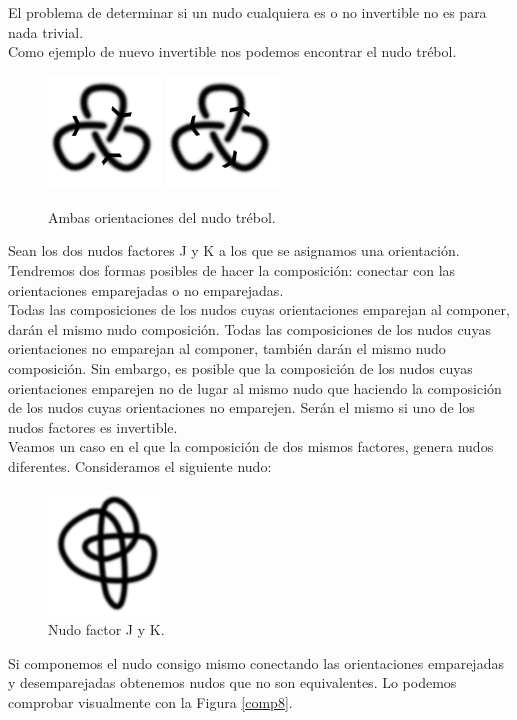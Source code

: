 \documentclass[14pt]{extarticle}
\begin{document}
      El problema de determinar si un nudo cualquiera es o no invertible no es para nada trivial.\\
   
   Como ejemplo de nuevo invertible nos podemos encontrar el nudo trébol.
      \begin{figure}[h!]
      	\includegraphics[width=3cm]{3fcon1.png}
      	\includegraphics[width=3cm]{3fcon2.png}
      	\centering
      	\caption{Ambas orientaciones del nudo trébol.}
      	\label{comp5} 
      \end{figure}
   
   Sean los dos nudos factores J y K a los que se asignamos una orientación. Tendremos dos formas posibles de hacer la composición: conectar con las orientaciones emparejadas o no emparejadas. \\
   Todas las composiciones de los nudos cuyas orientaciones emparejan al componer, darán el mismo nudo composición. Todas las composiciones de los nudos cuyas orientaciones no emparejan al componer, también darán el mismo nudo composición. Sin embargo, es posible que la composición de los nudos cuyas orientaciones emparejen no de lugar al mismo nudo que haciendo la composición de los nudos cuyas orientaciones no emparejen. Serán el mismo si uno de los nudos factores es invertible.\\
   
   Veamos un caso en el que la composición de dos mismos factores, genera nudos diferentes. Consideramos el siguiente nudo:
         \begin{figure}[h!]
         	\includegraphics[width=3cm]{817.png}
         	\centering
         	\caption{Nudo factor J y K.}
         	\label{comp7} 
         \end{figure}
   Si componemos el nudo consigo mismo conectando las orientaciones emparejadas y desemparejadas obtenemos nudos que no son equivalentes. Lo podemos comprobar visualmente con la Figura \ref{comp8}.
   
\end{document}
